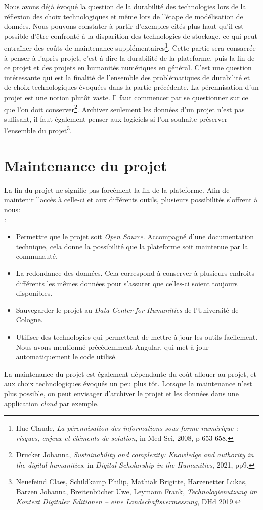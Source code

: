 Nous avons déjà évoqué la question de la durabilité des technologies lors de la réflexion des choix technologiques et même lors de l’étape de modélisation de données. Nous pouvons constater à partir d’exemples cités plus haut qu'il est possible d’être confronté à la disparition des technologies de stockage, ce qui peut entraîner des coûts de maintenance supplémentaires\footnote{Huc Claude, \textit{La pérennisation des informations sous forme numérique : risques, enjeux et éléments de solution}, in Med Sci, 2008, p 653-658.}. Cette partie sera consacrée à penser à l’après-projet, c’est-à-dire la durabilité de la plateforme, puis la fin de ce projet et des projets en humanités numériques en général. C’est une question intéressante qui est la finalité de l’ensemble des problématiques de durabilité et de choix technologiques évoquées dans la partie précédente.
La pérennisation d’un projet est une notion plutôt vaste. Il faut commencer par se questionner sur ce que l’on doit conserver\footnote{Drucker Johanna, \textit{Sustainability and complexity: Knowledge and authority in the digital humanities}, in \textit{Digital Scholarship in the Humanities}, 2021, pp9.}. Archiver seulement les données d’un projet n’est pas suffisant, il faut également penser aux logiciels si l’on souhaite préserver l’ensemble du projet\footnote{Neuefeind Claes, Schildkamp Philip, Mathiak Brigitte, Harzenetter Lukas, Barzen Johanna, Breitenbücher Uwe, Leymann Frank, \textit{Technologienutzung im Kontext Digitaler Editionen – eine Landschaftsvermessung}, DHd 2019.}.

\chapter{Maintenance du projet}

La fin du projet ne signifie pas forcément la fin de la plateforme. Afin de maintenir l’accès à celle-ci et aux différents outils, plusieurs possibilités s’offrent à nous: \\: 
\begin{itemize}
\item Permettre que le projet soit \textit{Open Source}. Accompagné d'une documentation technique, cela donne la possibilité que la plateforme soit maintenue par la communauté.
\item La redondance des données. Cela correspond à conserver à plusieurs endroits différents les mêmes données pour s'assurer que celles-ci soient toujours disponibles.
\item Sauvegarder le projet au \textit{Data Center for Humanities} de l'Université de Cologne.
\item Utiliser des technologies qui permettent de mettre à jour les outils facilement. Nous avons mentionné précédemment Angular, qui met à jour automatiquement le code utilisé.
\end{itemize}

La maintenance du projet est également dépendante du coût allouer au projet, et aux choix technologiques évoqués un peu plus tôt. Lorsque la maintenance n'est plus possible, on peut envisager d'archiver le projet et les données dans une application \textit{cloud} par exemple.




